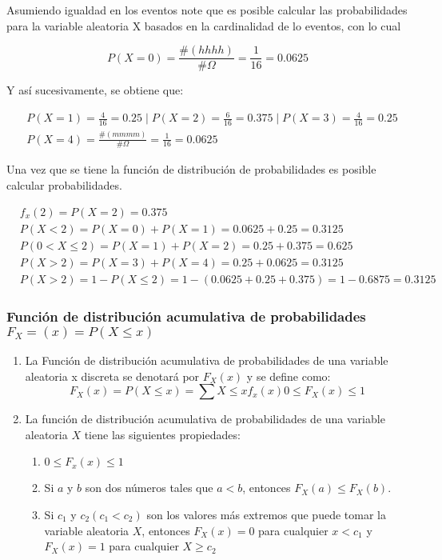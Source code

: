 Asumiendo igualdad en los eventos note que es posible
calcular las probabilidades para la variable aleatoria X
basados en la cardinalidad de lo eventos, con lo cual

\begin{equation*}
    P(X=0)=\frac{\#(hhhh)}{\#\Omega} =\frac{1}{16}=0.0625
\end{equation*}

Y así sucesivamente, se obtiene que:

\begin{align*}
     & P(X=1)=\frac{4}{16}=0.25\mid P(X=2)=\frac{6}{16}=0.375\mid P(X=3)=\frac{4}{16}=0.25 \\
     & P(X=4)=\frac{\#(mmmm)}{\#\Omega}=\frac{1}{16}=0.0625
\end{align*}

Una vez que se tiene la función de distribución de
probabilidades es posible calcular probabilidades.

\begin{align*}
     & f_x(2)=P(X=2)=0.375\\
     & P(X<2)=P(X=0)+P(X=1)=0.0625+0.25=0.3125\\
     & P(0<X\leq 2)=P(X=1)+P(X=2)=0.25+0.375=0.625\\
     & P(X>2)=P(X=3)+P (X=4)=0.25+0.0625=0.3125\\
     & P(X>2)=1-P(X\leq 2)=1-(0.0625+0.25+0.375)=1-0.6875=0.3125
\end{align*}

\subsubsection{Función de distribución acumulativa de probabilidades $F_X=(x)=P(X\leq x)$}

\begin{enumerate}
    \item La Función de distribución acumulativa de probabilidades de una variable aleatoria x discreta se denotará por $F_X(x)$ y se define como:
          \begin{equation}
              F_X(x)=P(X\leq x)=\sum X\leq xf_x(x)0\leq F_X(x)\leq 1
          \end{equation}
    \item La función de distribución acumulativa de probabilidades de una variable
          aleatoria $X$ tiene las siguientes propiedades:
          \begin{enumerate}
              \item $0\leq F_x(x)\leq 1$
              \item Si $a$ y $b$ son dos números tales que $a<b$, entonces $F_X(a)\leq F_X(b)$.
              \item Si $c_1$ y $c_2(c_1< c_2)$ son los valores más extremos que puede tomar la variable aleatoria $X$, entonces $F_X(x)=0$ para cualquier $x<c_1$ y $F_X(x)=1$ para cualquier $X\geq c_2$
          \end{enumerate}
\end{enumerate}

